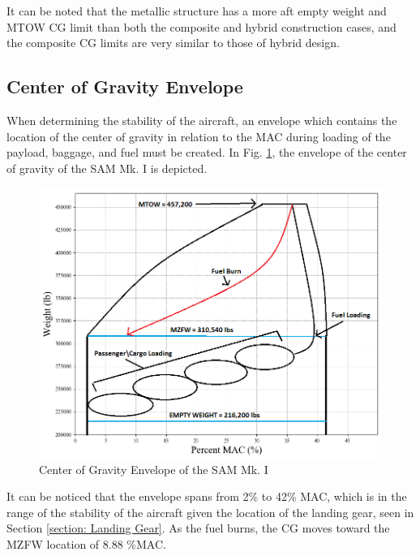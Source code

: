 It can be noted that the metallic structure has a more aft empty weight and MTOW CG limit than both the composite and hybrid construction cases, and the composite CG limits are very similar to those of hybrid design.

\subsection{Center of Gravity Envelope}
When determining the stability of the aircraft, an envelope which contains the location of the center of gravity in relation to the MAC during loading of the payload, baggage, and fuel must be created. In Fig. \ref{fig:cg_envelope}, the envelope of the center of gravity of the SAM Mk. I is depicted.

\begin{figure}[!h]
    \centering
    \includegraphics[width=\linewidth]{Photos/massprops/CG Envelope.png}
    \caption{Center of Gravity Envelope of the SAM Mk. I}
    \label{fig:cg_envelope}
\end{figure}

It can be noticed that the envelope spans from 2\% to 42\% MAC, which is in the range of the stability of the aircraft given the location of the landing gear, seen in Section \ref{section: Landing Gear}. As the fuel burns, the CG moves toward the MZFW location of 8.88 \%MAC.





